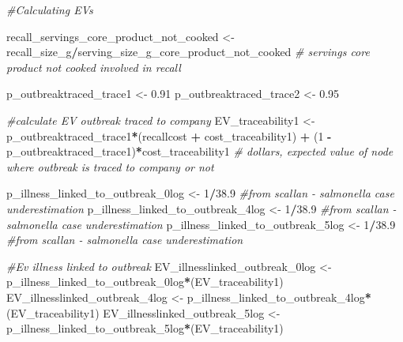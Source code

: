 \documentclass[
]{article}
\newenvironment{Shaded}{\begin{snugshade}}{\end{snugshade}}
\newcommand{\CommentTok}[1]{\textcolor[rgb]{0.56,0.35,0.01}{\textit{#1}}}
\newcommand{\DecValTok}[1]{\textcolor[rgb]{0.00,0.00,0.81}{#1}}
\newcommand{\FloatTok}[1]{\textcolor[rgb]{0.00,0.00,0.81}{#1}}
\newcommand{\NormalTok}[1]{#1}
\newcommand{\OtherTok}[1]{\textcolor[rgb]{0.56,0.35,0.01}{#1}}
\newcommand{\SpecialCharTok}[1]{\textcolor[rgb]{0.81,0.36,0.00}{\textbf{#1}}}
\begin{document}
\begin{Shaded}
\begin{Highlighting}[]
\CommentTok{\#Calculating EVs}

\NormalTok{recall\_servings\_core\_product\_not\_cooked }\OtherTok{\textless{}{-}}\NormalTok{ recall\_size\_g}\SpecialCharTok{/}\NormalTok{serving\_size\_g\_core\_product\_not\_cooked }\CommentTok{\# servings core product not cooked involved in recall}

\NormalTok{p\_outbreaktraced\_trace1 }\OtherTok{\textless{}{-}} \FloatTok{0.91}
\NormalTok{p\_outbreaktraced\_trace2 }\OtherTok{\textless{}{-}} \FloatTok{0.95}


\CommentTok{\#calculate EV outbreak traced to company}
\NormalTok{EV\_traceability1 }\OtherTok{\textless{}{-}}\NormalTok{ p\_outbreaktraced\_trace1}\SpecialCharTok{*}\NormalTok{(recallcost }\SpecialCharTok{+}\NormalTok{ cost\_traceability1) }\SpecialCharTok{+}\NormalTok{ (}\DecValTok{1} \SpecialCharTok{{-}}\NormalTok{ p\_outbreaktraced\_trace1)}\SpecialCharTok{*}\NormalTok{cost\_traceability1 }\CommentTok{\# dollars, expected value of node where outbreak is traced to company or not}

\NormalTok{p\_illness\_linked\_to\_outbreak\_0log }\OtherTok{\textless{}{-}} \DecValTok{1}\SpecialCharTok{/}\FloatTok{38.9} \CommentTok{\#from scallan {-} salmonella case underestimation}
\NormalTok{p\_illness\_linked\_to\_outbreak\_4log }\OtherTok{\textless{}{-}} \DecValTok{1}\SpecialCharTok{/}\FloatTok{38.9} \CommentTok{\#from scallan {-} salmonella case underestimation}
\NormalTok{p\_illness\_linked\_to\_outbreak\_5log }\OtherTok{\textless{}{-}} \DecValTok{1}\SpecialCharTok{/}\FloatTok{38.9} \CommentTok{\#from scallan {-} salmonella case underestimation}


\CommentTok{\#Ev illness linked to outbreak}
\NormalTok{EV\_illnesslinked\_outbreak\_0log }\OtherTok{\textless{}{-}}\NormalTok{ p\_illness\_linked\_to\_outbreak\_0log}\SpecialCharTok{*}\NormalTok{(EV\_traceability1) }
\NormalTok{EV\_illnesslinked\_outbreak\_4log }\OtherTok{\textless{}{-}}\NormalTok{ p\_illness\_linked\_to\_outbreak\_4log}\SpecialCharTok{*}\NormalTok{(EV\_traceability1) }
\NormalTok{EV\_illnesslinked\_outbreak\_5log }\OtherTok{\textless{}{-}}\NormalTok{ p\_illness\_linked\_to\_outbreak\_5log}\SpecialCharTok{*}\NormalTok{(EV\_traceability1) }



\end{Highlighting}
\end{Shaded}
\end{document}

